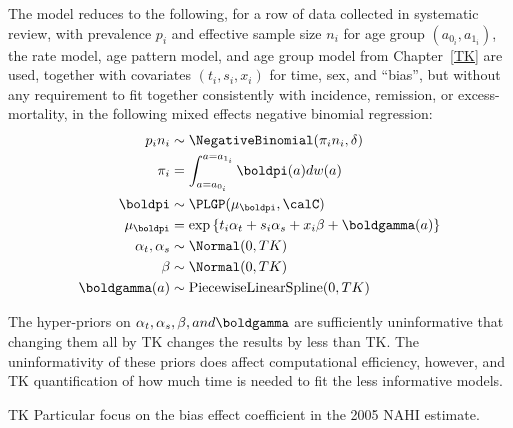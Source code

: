 The model reduces to the following, for a row of data collected in
systematic review, with prevalence $p_i$ and effective sample size $n_i$ for
age group $(a_{0_i}, a_{1_i})$, the rate model, age pattern model,
and age group model from Chapter~\ref{TK} are used, together with
covariates $(t_i,s_i,x_i)$ for time, sex, and ``bias'', but without any requirement to
fit together consistently with incidence, remission, or
excess-mortality, in the following mixed effects negative binomial
regression:
\begin{align*}
p_i n_i &\sim \NegativeBinomial(\pi_i n_i, \delta)\\
\pi_i &= \int _{a=a_{0_i}} ^{a=a_{1_i}} \boldpi(a) dw(a)\\
\boldpi &\sim \PLGP(\mu_\boldpi, \calC)\\
\mu_\boldpi &= \exp\left\{ t_i \alpha_t + s_i \alpha_s + x_i \beta + \boldgamma(a) \right\}\\
\alpha_t, \alpha_s &\sim \Normal(0, TK)\\
\beta &\sim \Normal(0, TK)\\
\boldgamma(a) &\sim \text{PiecewiseLinearSpline}(0, TK)
\end{align*}

The hyper-priors on $\alpha_t, \alpha_s, \beta, and \boldgamma$ are
sufficiently uninformative that changing them all by TK changes the
results by less than TK.  The uninformativity of these priors does
affect computational efficiency, however, and TK quantification of how
much time is needed to fit the less informative models.

TK Particular focus on the bias effect coefficient in the 2005 NAHI estimate.
